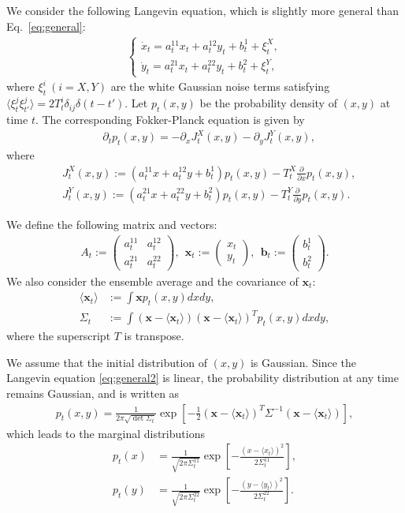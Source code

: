 \documentclass[%
 reprint,
 amsmath,amssymb,
 aps,
]{revtex4-1}
\newcommand{\balign}[1]{\begin{align} #1 \end{align}}
\newcommand{\average}[1]{\ensuremath{\langle#1\rangle} }
\newcommand{\eref}[1]{Eq.~\eqref{#1}}
\newcommand{\del}{\partial}
\theoremstyle{plain}
\begin{document}
We consider the following Langevin equation, which is slightly more general than \eref{eq:general}:
\begin{eqnarray}
\begin{cases}
\dot{x}_t=a_t^{11}x_t+a_t^{12}y_t+b_t^1+\xi^X_t, \\
\dot{y}_t=a_t^{21}x_t+a_t^{22}y_t+b_t^2+\xi^Y_t, \label{eq:general2}
\end{cases}
\end{eqnarray}
where $\xi^i_t\ (i=X,Y)$ are the white Gaussian noise terms satisfying $\average{\xi^j_t\xi^j_{t'}}=2T_t^i\delta_{ij}\delta(t-t')$. 
Let $p_t(x,y)$ be the probability density of $(x,y)$ at time $t$.  The corresponding Fokker-Planck equation is given by
\balign{
&\del_tp_t(x,y)=-\del_x J^X_t(x,y)-\del_y J^Y_t(x,y), \label{eq:pt}
}
where
\balign{
&J^X_t(x,y):=\left(a_t^{11}x+a_t^{12}y+b^1_t\right)p_t(x,y)-T^X_t\frac{\del}{\del x}p_t(x,y), \label{eq:Jx} \\
&J^Y_t(x,y):=\left(a_t^{21}x+a_t^{22}y+b^2_t\right)p_t(x,y)-T^Y_t\frac{\del}{\del y}p_t(x,y).
}

We define the following matrix and vectors:
\balign{
A_t:=
\begin{pmatrix}
a_t^{11} &a_t^{12} \\
a^{21}_t &a_t^{22}
\end{pmatrix}, \ \ 
\bm{x}_t := \left(
    \begin{array}{c}
      x_t \\
      y_t          
         \end{array}
  \right), \ \ 
  \bm{b}_t :=\left(
    \begin{array}{c}
      b^1_t \\
      b^2_t          
         \end{array}
  \right).
}
We also consider the ensemble average  and the covariance of $\bm x_t$:
\balign{
\average{\bm{x}_t}&:=\int \bm{x}p_t(x,y) dxdy, \\
\Sigma_t&:=\int (\bm{x}-\average{\bm{x}_t})(\bm{x}-\average{\bm{x}_t})^Tp_t(x,y)dxdy, \label{eq:vcov}
}
where the superscript $T$ is transpose.

We assume that the initial distribution of $(x,y)$ is Gaussian. Since the Langevin equation \eqref{eq:general2} is linear, the probability distribution at any time remains Gaussian,  and is written as
\balign{
p_t(x,y)=\frac{1}{2\pi\sqrt{\det\Sigma_t}}\exp\left[ -\frac{1}{2}(\bm{x}-\average{\bm{x}_t})^T\Sigma^{-1}(\bm{x}-\average{\bm{x}_t}) \right], \label{eq:pxy}
}
which leads to the marginal distributions
\balign{
p_t(x)&=\frac{1}{\sqrt{2\pi\Sigma_t^{11}}}\exp\left[ -\frac{(x-\average{x_t})^2}{2\Sigma_t^{11}} \right], \label{eq:px}\\
p_t(y)&=\frac{1}{\sqrt{2\pi\Sigma_t^{22}}}\exp\left[ -\frac{(y-\average{y_t})^2}{2\Sigma_t^{22}} \right]. \label{eq:py}
}
\end{document}
